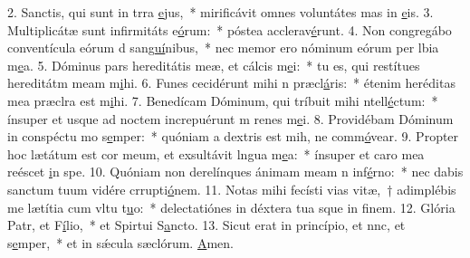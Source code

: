 2. Sanctis, qui sunt in trra \uline{e}jus,~* mirificávit omnes voluntátes mas in \uline{e}is.
3. Multiplicátæ sunt infirmitáts e\uline{ó}rum:~* póstea acclerav\uline{é}runt.
4. Non congregábo conventícula eórum d san\uline{guí}nibus,~* nec memor ero nóminum eórum per lbia m\uline{e}a.
5. Dóminus pars hereditátis meæ, et cálcis m\uline{e}i:~* tu es, qui restítues hereditátm meam m\uline{i}hi.
6. Funes cecidérunt mihi n præcl\uline{á}ris:~* étenim heréditas mea præclra est m\uline{i}hi.
7. Benedícam Dóminum, qui tríbuit mihi ntell\uline{é}ctum:~* ínsuper et usque ad noctem increpuérunt m renes m\uline{e}i.
8. Providébam Dóminum in conspéctu mo s\uline{e}mper:~* quóniam a dextris est mih, ne comm\uline{ó}vear.
9. Propter hoc lætátum est cor meum, et exsultávit lngua m\uline{e}a:~* ínsuper et caro mea reéscet \uline{i}n spe.
10. Quóniam non derelínques ánimam meam n inf\uline{é}rno:~* nec dabis sanctum tuum vidére crrupti\uline{ó}nem.
11. Notas mihi fecísti vias vitæ,~† adimplébis me lætítia cum vltu t\uline{u}o:~* delectatiónes in déxtera tua sque in f\uline{i}nem.
12. Glória Patr, et F\uline{í}lio,~* et Spirtui S\uline{a}ncto.
13. Sicut erat in princípio, et nnc, et s\uline{e}mper,~* et in sǽcula sæclórum. \uline{A}men.
